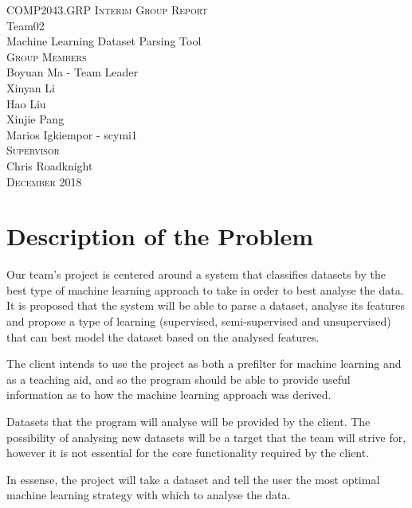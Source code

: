 \documentclass[titlepage]{article}
\author{Boyuan Ma \and Xinyan Li \and Hao Liu \and Xinjie Pang \and Marios Igkiempor}
\begin{document}
\begin{titlepage}
  \centering
  \large{\textsc{COMP2043.GRP Interim Group Report}}\\
  \vspace{3cm}
  \huge{Team02}\\
  \Huge{Machine Learning Dataset Parsing Tool}\\
  \vspace{3cm}
  \LARGE{\textsc{Group Members}}\\
  \Large{Boyuan Ma - Team Leader}\\
  \Large{Xinyan Li}\\
  \Large{Hao Liu}\\
  \Large{Xinjie Pang}\\
  \Large{Marios Igkiempor - scymi1}\\
  \vspace{1cm}
  \LARGE{\textsc{Supervisor}}\\
  \Large{Chris Roadknight}\\
  \vfill
  \large{\textsc{December 2018}}
  
\end{titlepage}

\tableofcontents
\pagebreak

\section{Description of the Problem}
Our team's project is centered around a system that classifies datasets by the best type of machine learning approach to take in order to best analyse the data. It is proposed that the system will be able to parse a dataset, analyse its features and propose a type of learning (supervised, semi-supervised and unsupervised) that can best model the dataset based on the analysed features.

The client intends to use the project as both a prefilter for machine learning and as a teaching aid, and so the program should be able to provide useful information as to how the machine learning approach was derived.

Datasets that the program will analyse will be provided by the client. The possibility of analysing new datasets will be a target that the team will strive for, however it is not essential for the core functionality required by the client.

In essense, the project will take a dataset and tell the user the most optimal machine learning strategy with which to analyse the data.
\end{document}
